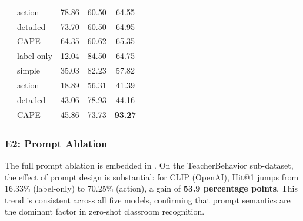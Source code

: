 \documentclass[symmetry,article,submit,pdftex,moreauthors]{Definitions/mdpi}
\begin{document}
\begin{table}[H]
\begin{tabular}{ll ccc}
 & action & 78.86 & 60.50 & 64.55 \\
 & detailed & 73.70 & 60.50 & 64.95 \\
 & CAPE & 64.35 & 60.62 & 65.35 \\
\addlinespace
\multirow{5}{*}{DFN-CLIP}
 & label-only & 12.04 & 84.50 & 64.75 \\
 & simple & 35.03 & 82.23 & 57.82 \\
 & action & 18.89 & 56.31 & 41.39 \\
 & detailed & 43.06 & 78.93 & 44.16 \\
 & CAPE & 45.86 & 73.73 & \textbf{93.27} \\
\bottomrule
\end{tabular}

\par
{}
\end{table}

\subsubsection{E2: Prompt Ablation}
\label{sec:e2}

The full prompt ablation is embedded in .
On the TeacherBehavior sub-dataset, the effect of prompt design is substantial: for CLIP (OpenAI), Hit@1 jumps from 16.33\% (label-only) to 70.25\% (action), a gain of \textbf{53.9 percentage points}.
This trend is consistent across all five models, confirming that prompt semantics are the dominant factor in zero-shot classroom recognition.
\end{document}
